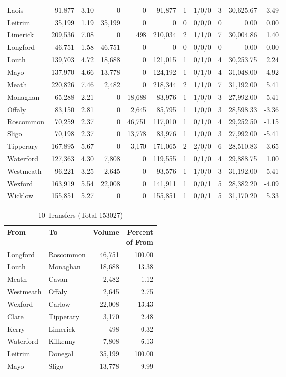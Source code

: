 \documentclass[a4paper]{article}
\begin{document}
\begin{longtable}{lrrrrrrlrrr}
Laois&91,877& 3.10&0&0&91,877&1&1/0/0&3&30,625.67& 3.49\\ 
Leitrim&35,199& 1.19&35,199&0&0&0&0/0/0&0& 0.00& 0.00\\ 
Limerick&209,536& 7.08&0&498&210,034&2&1/1/0&7&30,004.86& 1.40\\ 
Longford&46,751& 1.58&46,751&0&0&0&0/0/0&0& 0.00& 0.00\\ 
Louth&139,703& 4.72&18,688&0&121,015&1&0/1/0&4&30,253.75& 2.24\\ 
Mayo&137,970& 4.66&13,778&0&124,192&1&0/1/0&4&31,048.00& 4.92\\ 
Meath&220,826& 7.46&2,482&0&218,344&2&1/1/0&7&31,192.00& 5.41\\ 
Monaghan&65,288& 2.21&0&18,688&83,976&1&1/0/0&3&27,992.00&-5.41\\ 
Offaly&83,150& 2.81&0&2,645&85,795&1&1/0/0&3&28,598.33&-3.36\\ 
Roscommon&70,259& 2.37&0&46,751&117,010&1&0/1/0&4&29,252.50&-1.15\\ 
Sligo&70,198& 2.37&0&13,778&83,976&1&1/0/0&3&27,992.00&-5.41\\ 
Tipperary&167,895& 5.67&0&3,170&171,065&2&2/0/0&6&28,510.83&-3.65\\ 
Waterford&127,363& 4.30&7,808&0&119,555&1&0/1/0&4&29,888.75& 1.00\\ 
Westmeath&96,221& 3.25&2,645&0&93,576&1&1/0/0&3&31,192.00& 5.41\\ 
Wexford&163,919& 5.54&22,008&0&141,911&1&0/0/1&5&28,382.20&-4.09\\ 
Wicklow&155,851& 5.27&0&0&155,851&1&0/0/1&5&31,170.20& 5.33\\ 
\end{longtable}

\begin{table}[htbp]
\caption{10 Transfers (Total 153027)}
\centering
\begin{tabular}{llrr} \toprule
From &To &Volume &\shortstack{Percent\\of From} \\ \midrule
Longford&Roscommon&46,751&100.00\\ 
Louth&Monaghan&18,688&13.38\\ 
Meath&Cavan&2,482& 1.12\\ 
Westmeath&Offaly&2,645& 2.75\\ 
Wexford&Carlow&22,008&13.43\\ 
Clare&Tipperary&3,170& 2.48\\ 
Kerry&Limerick&498& 0.32\\ 
Waterford&Kilkenny&7,808& 6.13\\ 
Leitrim&Donegal&35,199&100.00\\ 
Mayo&Sligo&13,778& 9.99\\ 
\bottomrule
\end{tabular}
\end{table}
\end{document}
